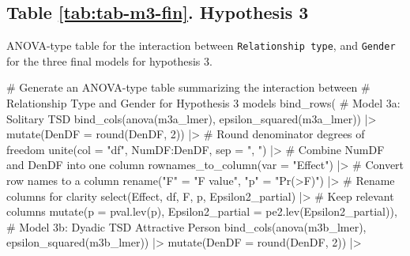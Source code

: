 \documentclass[
  bookmarksnumbered]{article}
\newenvironment{Shaded}{\begin{snugshade}}{\end{snugshade}}
\newcommand{\AttributeTok}[1]{\textcolor[rgb]{0.80,0.80,0.80}{#1}}
\newcommand{\CommentTok}[1]{\textcolor[rgb]{0.50,0.62,0.50}{#1}}
\newcommand{\DecValTok}[1]{\textcolor[rgb]{0.86,0.86,0.80}{#1}}
\newcommand{\FunctionTok}[1]{\textcolor[rgb]{0.94,0.94,0.56}{#1}}
\newcommand{\NormalTok}[1]{\textcolor[rgb]{0.80,0.80,0.80}{#1}}
\newcommand{\OtherTok}[1]{\textcolor[rgb]{0.94,0.94,0.56}{#1}}
\newcommand{\SpecialCharTok}[1]{\textcolor[rgb]{0.86,0.64,0.64}{#1}}
\newcommand{\StringTok}[1]{\textcolor[rgb]{0.80,0.58,0.58}{#1}}
\begin{document}
\subsection{Table \ref{tab:tab-m3-fin}. Hypothesis 3}\label{table-reftabtab-m3-fin.-hypothesis-3}

ANOVA-type table for the interaction between \texttt{Relationship\ type}, and \texttt{Gender} for the three final models for hypothesis 3.

\begin{Shaded}
\begin{Highlighting}[]
\CommentTok{\# Generate an ANOVA{-}type table summarizing the interaction between}
\CommentTok{\# Relationship Type and Gender for Hypothesis 3 models}
\FunctionTok{bind\_rows}\NormalTok{(}
  \CommentTok{\# Model 3a: Solitary TSD}
  \FunctionTok{bind\_cols}\NormalTok{(}\FunctionTok{anova}\NormalTok{(m3a\_lmer), }\FunctionTok{epsilon\_squared}\NormalTok{(m3a\_lmer)) }\SpecialCharTok{|\textgreater{}}
    \FunctionTok{mutate}\NormalTok{(}\AttributeTok{DenDF =} \FunctionTok{round}\NormalTok{(DenDF, }\DecValTok{2}\NormalTok{)) }\SpecialCharTok{|\textgreater{}} \CommentTok{\# Round denominator degrees of freedom}
    \FunctionTok{unite}\NormalTok{(}\AttributeTok{col =} \StringTok{"df"}\NormalTok{, NumDF}\SpecialCharTok{:}\NormalTok{DenDF, }\AttributeTok{sep =} \StringTok{", "}\NormalTok{) }\SpecialCharTok{|\textgreater{}} \CommentTok{\# Combine NumDF and DenDF into one column}
    \FunctionTok{rownames\_to\_column}\NormalTok{(}\AttributeTok{var =} \StringTok{"Effect"}\NormalTok{) }\SpecialCharTok{|\textgreater{}} \CommentTok{\# Convert row names to a column}
    \FunctionTok{rename}\NormalTok{(}\StringTok{"F"} \OtherTok{=} \StringTok{"F value"}\NormalTok{, }\StringTok{"p"} \OtherTok{=} \StringTok{"Pr(\textgreater{}F)"}\NormalTok{) }\SpecialCharTok{|\textgreater{}} \CommentTok{\# Rename columns for clarity}
    \FunctionTok{select}\NormalTok{(Effect, df, F, p, Epsilon2\_partial) }\SpecialCharTok{|\textgreater{}} \CommentTok{\# Keep relevant columns}
    \FunctionTok{mutate}\NormalTok{(}\AttributeTok{p =} \FunctionTok{pval.lev}\NormalTok{(p), }\AttributeTok{Epsilon2\_partial =} \FunctionTok{pe2.lev}\NormalTok{(Epsilon2\_partial)),}
  \CommentTok{\# Model 3b: Dyadic TSD Attractive Person}
  \FunctionTok{bind\_cols}\NormalTok{(}\FunctionTok{anova}\NormalTok{(m3b\_lmer), }\FunctionTok{epsilon\_squared}\NormalTok{(m3b\_lmer)) }\SpecialCharTok{|\textgreater{}}
    \FunctionTok{mutate}\NormalTok{(}\AttributeTok{DenDF =} \FunctionTok{round}\NormalTok{(DenDF, }\DecValTok{2}\NormalTok{)) }\SpecialCharTok{|\textgreater{}}

\end{Highlighting}
\end{Shaded}
\end{document}
